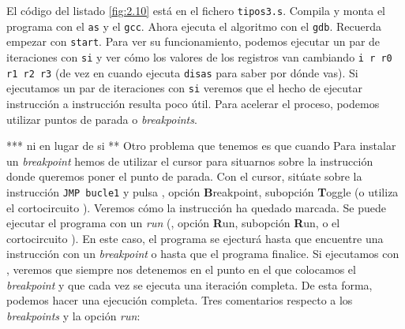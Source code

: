 El código del listado \ref{fig:2.10} está en el fichero {\tt tipos3.s}. Compila y
monta el programa con el {\tt as} y el {\tt gcc}. Ahora ejecuta el algoritmo
con el {\tt gdb}. Recuerda empezar con {\tt start}. Para ver su funcionamiento,
podemos ejecutar un par de iteraciones con {\tt si} y ver cómo los valores de
los registros van cambiando {\tt i r r0 r1 r2 r3} (de vez en cuando ejecuta
{\tt disas} para saber por dónde vas). Si ejecutamos un par de iteraciones con
{\tt si} veremos que el hecho de ejecutar instrucción a instrucción resulta
poco útil. Para acelerar el proceso, podemos utilizar puntos de parada o {\it breakpoints}.


*** ni en lugar de si **
Otro problema que tenemos es que cuando 
Para instalar un {\it breakpoint} hemos de utilizar el cursor para situarnos
sobre la instrucción donde queremos poner el punto de parada. Con el
cursor, sitúate sobre la instrucción {\tt JMP bucle1} y pulsa , opción
{\bf B}reakpoint, subopción {\bf T}oggle (o utiliza el cortocircuito
).
Veremos cómo la instrucción ha quedado marcada. Se puede ejecutar el
programa con un {\it run} (, opción {\bf R}un, subopción {\bf
R}un, o el
cortocircuito ). En este caso, el programa se ejecturá hasta que
encuentre una instrucción con un {\it breakpoint} o hasta que el programa
finalice. Si ejecutamos con , veremos que siempre nos detenemos en
el punto en el que colocamos el {\it breakpoint} y que cada vez se ejecuta
una iteración completa. De esta forma, podemos hacer una ejecución
completa. Tres comentarios respecto a los {\it breakpoints} y la
opción {\it run}:



\chapterend{}

